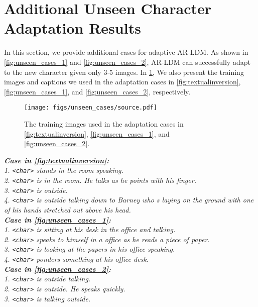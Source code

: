 \documentclass[10pt,twocolumn,letterpaper]{article}
\begin{document}
\setlength\parindent{1pc}

\clearpage
\section{Additional Unseen Character Adaptation Results}
\label{sec:additional_unseen_character_adaptation_results}
In this section, we provide additional cases for adaptive AR-LDM. As shown in \cref{fig:unseen_cases_1} and \cref{fig:unseen_cases_2}, AR-LDM can successfully adapt to the new character given only 3-5 images. In \cref{fig:unseen_cases_source}, We also present the training images and captions we used in the adaptation cases in \cref{fig:textualinversion}, \cref{fig:unseen_cases_1}, and \cref{fig:unseen_cases_2}, respectively.

\begin{figure}[!th]
\centering
\texttt{[image: figs/unseen\_cases/source.pdf]}
\caption{The training images used in the adaptation cases in \cref{fig:textualinversion}, \cref{fig:unseen_cases_1}, and \cref{fig:unseen_cases_2}.}
\label{fig:unseen_cases_source}
\end{figure}

\setlength\parindent{0pt}
\footnotesize{\textit{
\textbf{Case in \cref{fig:textualinversion}:}\\
1. \texttt{<char>} stands in the room speaking.\\
2. \texttt{<char>} is in the room. He talks as he points with his finger.\\
3. \texttt{<char>} is outside.\\
4. \texttt{<char>} is outside talking down to Barney who s laying on the ground with one of his hands stretched out above his head.\\
\textbf{Case in \cref{fig:unseen_cases_1}:}\\
1. \texttt{<char>} is sitting at his desk in the office and talking.\\
2. \texttt{<char>} speaks to himself in a office as he reads a piece of paper.\\
3. \texttt{<char>} is looking at the papers in his office speaking.\\
4. \texttt{<char>} ponders something at his office desk.\\
\textbf{Case in \cref{fig:unseen_cases_2}:}\\
1. \texttt{<char>} is outside talking.\\
2. \texttt{<char>} is outside. He speaks quickly.\\
3. \texttt{<char>} is talking outside.\\
}}
\setlength\parindent{1pc}
\end{document}
